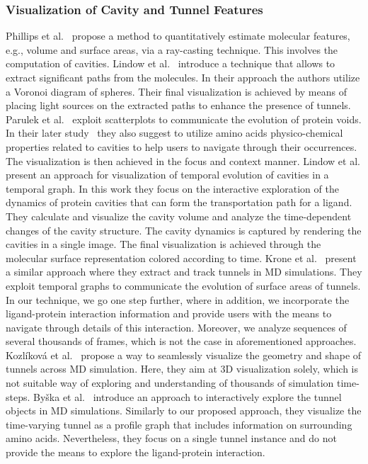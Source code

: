 \documentclass[twocolumn]{bmcart}%
\begin{document}
\subsubsection*{Visualization of Cavity and Tunnel Features}
Phillips et al.~\cite{phillips2010} propose a method to quantitatively estimate molecular features, e.g., volume and surface areas, via a ray-casting technique. 
This involves the computation of cavities.
Lindow et al.~\cite{LindowBH11} introduce a technique that allows to extract significant paths from the molecules. 
In their approach the authors utilize a Voronoi diagram of spheres. 
Their final visualization is achieved by means of placing light sources on the extracted paths to enhance the presence of tunnels.
Parulek et al.~\cite{parulek2012} exploit scatterplots to communicate the evolution of protein voids. 
In their later study~\cite{parulek2013} they also suggest to utilize amino acids physico-chemical properties related to cavities to help users to navigate through their occurrences. 
The visualization is then achieved in the focus and context manner.
Lindow et al. \cite{Lindow2013} present an approach for visualization of temporal evolution of cavities in a temporal graph. 
In this work they focus on the interactive exploration of the dynamics of protein cavities that can form the transportation path for a ligand. 
They calculate and visualize the cavity volume and analyze the time-dependent changes of the cavity structure.
The cavity dynamics is captured by rendering the cavities in a single image. 
The final visualization is achieved through the molecular surface representation colored according to time. 
Krone et al.~\cite{krone2013features} present a similar approach where they extract and track tunnels in MD simulations. 
They exploit temporal graphs to communicate the evolution of surface areas of tunnels. 
In our technique, we go one step further, where in addition, we incorporate the ligand-protein interaction information and provide users with the means to navigate through details of this interaction. 
Moreover, we analyze sequences of several thousands of frames, which is not the case in aforementioned approaches.
Kozl\'{i}kov\'{a} et al.~\cite{kozlikova2014vcbm} propose a way to seamlessly visualize the geometry and shape of tunnels across MD simulation. 
Here, they aim at 3D visualization solely, which is not suitable way of exploring and understanding of thousands of simulation time-steps.
By\v{s}ka et al.~\cite{byska2016} introduce an approach to interactively explore the tunnel objects in MD simulations. 
Similarly to our proposed approach, they visualize the time-varying tunnel as a profile graph that includes information on surrounding amino acids. 
Nevertheless, they focus on a single tunnel instance and do not provide the means to explore the ligand-protein interaction.
\end{document}
